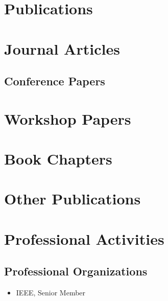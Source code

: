 \documentclass[11pt]{article}
\begin{document}
\vspace{1em}

\section*{Publications}


\begin{enumerate}
\section*{Journal Articles}


\subsection*{Conference Papers}


\section*{Workshop Papers}


\section*{Book Chapters}


\section*{Other Publications}

\end{enumerate}

\section*{Professional Activities}

\subsection*{Professional Organizations}
\begin{itemize}[leftmargin=1.5em]
  \item IEEE, Senior Member
\end{itemize}
\end{document}
